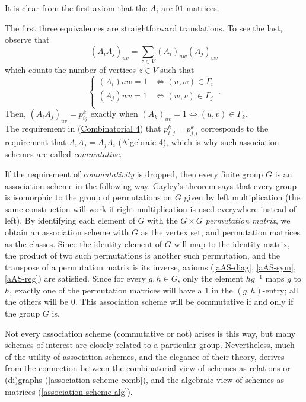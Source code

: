 \documentclass{report}
\begin{document}
    It is clear from the first axiom that the $A_i$ are $01$ matrices.

    The first three equivalences are straightforward translations.  To see the
    last, observe that
    $$
      (A_i A_j)_{uv} = \sum_{z \in V} (A_i)_{uw} (A_j)_{wv}
    $$
    which counts the number of vertices $z \in V$ such that
    $$
      \begin{cases}
        (A_i){uw} = 1 & \iff (u, w) \in \Gamma_i \\
        (A_j){wv} = 1 & \iff (w, v) \in \Gamma_j \\
      \end{cases}\ .
    $$
    Then, $(A_i A_j)_{uv} = p_{ij}^k$ exactly when $(A_k)_{uv} = 1 \iff (u, v)
    \in \Gamma_k$.
    \\


    The requirement in (\hyperref[cAS-reg]{Combinatorial 4}) that $p_{i, j}^k =
    p_{j, i}^k$ corresponds to the requirement that $A_i A_j = A_j A_i$
    (\hyperref[aAS-reg]{Algebraic 4}), which is why such association schemes are
    called \textit{commutative}.

    If the requirement of \textit{commutativity} is dropped, then every finite
    group $G$ is an association scheme in the following way.  Cayley's theorem
    says that every group is isomorphic to the group of permutations on $G$
    given by left multiplication (the same construction will work if right
    multiplication is used everywhere instead of left).  By identifying each
    element of $G$ with the $G \times G$ \textit{permutation matrix}, we obtain
    an association scheme with $G$ as the vertex set, and permutation matrices
    as the classes.  Since the identity element of $G$ will map to the identity
    matrix, the product of two such permutations is another such permutation,
    and the transpose of a permutation matrix is its inverse, axioms
    (\ref{aAS-diag}, \ref{aAS-sym}, \ref{aAS-reg}) are satisfied.  Since for
    every $g, h \in G$, only the element $hg^{-1}$ maps $g$ to $h$, exactly one
    of the permutation matrices will have a $1$ in the $(g, h)$-entry; all the
    others will be $0$.  This association scheme will be commutative if and only
    if the group $G$ is.

    Not every association scheme (commutative or not) arises is this way, but
    many schemes of interest are closely related to a particular group.
    Nevertheless, much of the utility of association schemes, and the elegance
    of their theory, derives from the connection between the combinatorial view
    of schemes as relations or (di)graphs (\ref{association-scheme-comb}), and
    the algebraic view of schemes as matrices (\ref{association-scheme-alg}).
    \\
\end{document}
